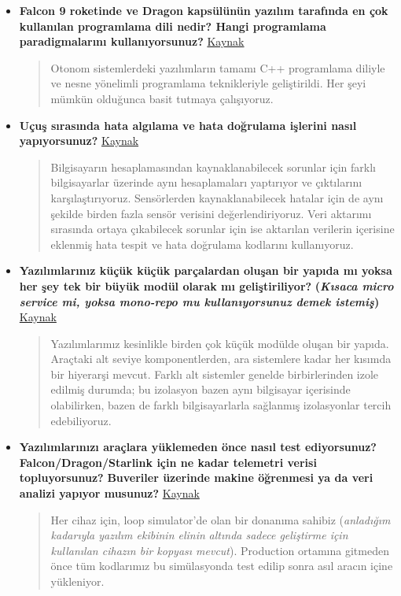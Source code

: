 \documentclass[11pt]{article}
\begin{document}
\begin{itemize}
\item \textbf{Falcon 9 roketinde ve Dragon kapsülünün yazılım tarafında en çok kullanılan
programlama dili nedir? Hangi programlama paradigmalarını kullanıyorsunuz?}
\href{https://www.reddit.com/r/spacex/comments/gxb7j1/we\_are\_the\_spacex\_software\_team\_ask\_us\_anything/ft0aj3b/}{Kaynak}
\begin{quote}
Otonom sistemlerdeki yazılımların tamamı C++ programlama diliyle ve nesne
yönelimli programlama teknikleriyle geliştirildi. Her şeyi mümkün olduğunca
basit tutmaya çalışıyoruz.
\end{quote}

\item \textbf{Uçuş sırasında hata algılama ve hata doğrulama işlerini nasıl
yapıyorsunuz?} \href{https://www.reddit.com/r/spacex/comments/gxb7j1/we\_are\_the\_spacex\_software\_team\_ask\_us\_anything/ft0aj3b/}{Kaynak}
\begin{quote}
Bilgisayarın hesaplamasından kaynaklanabilecek sorunlar için farklı
bilgisayarlar üzerinde aynı hesaplamaları yaptırıyor ve çıktılarını
karşılaştırıyoruz. Sensörlerden kaynaklanabilecek hatalar için de aynı şekilde
birden fazla sensör verisini değerlendiriyoruz. Veri aktarımı sırasında ortaya
çıkabilecek sorunlar için ise aktarılan verilerin içerisine eklenmiş hata
tespit ve hata doğrulama kodlarını kullanıyoruz.
\end{quote}

\item \textbf{Yazılımlarınız küçük küçük parçalardan oluşan bir yapıda mı yoksa her şey
tek bir büyük modül olarak mı geliştiriliyor?} \textbf{(\emph{Kısaca micro service mi,
yoksa mono-repo mu kullanıyorsunuz demek istemiş})} \href{https://www.reddit.com/r/spacex/comments/gxb7j1/we\_are\_the\_spacex\_software\_team\_ask\_us\_anything/ft0aj3b/}{Kaynak}
\begin{quote}
Yazılımlarımız kesinlikle birden çok küçük modülde oluşan bir yapıda. Araçtaki
alt seviye komponentlerden, ara sistemlere kadar her kısımda bir hiyerarşi
mevcut. Farklı alt sistemler genelde birbirlerinden izole edilmiş durumda; bu
izolasyon bazen aynı bilgisayar içerisinde olabilirken, bazen de farklı
bilgisayarlarla sağlanmış izolasyonlar tercih edebiliyoruz.
\end{quote}

\item \textbf{Yazılımlarınızı araçlara yüklemeden önce nasıl test ediyorsunuz?}
\textbf{Falcon/Dragon/Starlink için ne kadar telemetri verisi topluyorsunuz?}
\textbf{Buveriler üzerinde makine öğrenmesi ya da veri analizi yapıyor musunuz?}
\href{https://www.reddit.com/r/spacex/comments/gxb7j1/we\_are\_the\_spacex\_software\_team\_ask\_us\_anything/ft0ahrd/}{Kaynak}
\begin{quote}
Her cihaz için, loop simulator'de olan bir donanıma sahibiz (\emph{anladığım
kadarıyla yazılım ekibinin elinin} \emph{altında sadece geliştirme için kullanılan
cihazın bir kopyası mevcut}). Production ortamına gitmeden önce tüm kodlarımız
bu simülasyonda test edilip sonra asıl aracın içine yükleniyor.


\end{quote}
\end{itemize}
\end{document}
